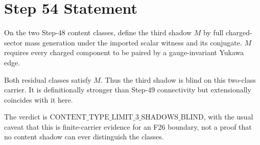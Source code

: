 \documentclass[11pt]{article}
\begin{document}
\section*{Step 54 Statement}
On the two Step-48 content classes, define the third shadow \(M\) by full charged-sector mass generation under the imported scalar witness and its conjugate. \(M\) requires every charged component to be paired by a gauge-invariant Yukawa edge.

Both residual classes satisfy \(M\). Thus the third shadow is blind on this two-class carrier. It is definitionally stronger than Step-49 connectivity but extensionally coincides with it here.

The verdict is \(\mathrm{CONTENT\_TYPE\_LIMIT\_3\_SHADOWS\_BLIND}\), with the usual caveat that this is finite-carrier evidence for an F26 boundary, not a proof that no content shadow can ever distinguish the classes.
\end{document}
